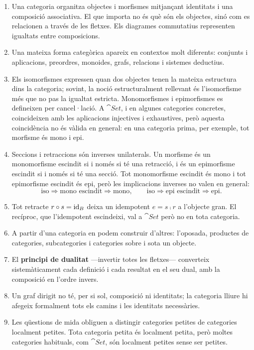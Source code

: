 \begin{resumcap}
\begin{enumerate}
  \item Una categoria organitza objectes i morfismes mitjançant identitats i una composició associativa. El que importa no és què són els objectes, sinó com es relacionen a través de les fletxes. Els diagrames commutatius representen igualtats entre composicions.
  \item Una mateixa forma categòrica apareix en contextos molt diferents: conjunts i aplicacions, preordres, monoides, grafs, relacions i sistemes deductius.
  \item Els isomorfismes expressen quan dos objectes tenen la mateixa estructura dins la categoria; sovint, la noció estructuralment rellevant és l'isomorfisme més que no pas la igualtat estricta. Monomorfismes i epimorfismes es defineixen per cancel·lació. A $\cat{Set}$, i en algunes categories concretes, coincideixen amb les aplicacions injectives i exhaustives, però aquesta coincidència no és vàlida en general: en una categoria prima, per exemple, tot morfisme és mono i epi.
  \item Seccions i retraccions són inverses unilaterals. Un morfisme és un monomorfisme escindit si i només si té una retracció, i és un epimorfisme escindit si i només si té una secció. Tot monomorfisme escindit és mono i tot epimorfisme escindit és epi, però les implicacions inverses no valen en general:
  \[
  \text{iso}\Longrightarrow\text{mono escindit}\Longrightarrow\text{mono},
  \qquad
  \text{iso}\Longrightarrow\text{epi escindit}\Longrightarrow\text{epi}.
  \]
  \item Tot retracte $r\circ s=\operatorname{id}_B$ deixa un idempotent $e=s\comp r$ a l'objecte gran. El recíproc, que l'idempotent escindeixi, val a $\cat{Set}$ però no en tota categoria.
  \item A partir d'una categoria en podem construir d'altres: l'oposada, productes de categories, subcategories i categories sobre i sota un objecte.
  \item El \textbf{principi de dualitat} ---invertir totes les fletxes--- converteix sistemàticament cada definició i cada resultat en el seu dual, amb la composició en l'ordre invers.
  \item Un graf dirigit no té, per si sol, composició ni identitats; la categoria lliure hi afegeix formalment tots els camins i les identitats necessàries.
  \item Les qüestions de mida obliguen a distingir categories petites de categories localment petites. Tota categoria petita és localment petita, però moltes categories habituals, com $\cat{Set}$, són localment petites sense ser petites.

\end{enumerate}
\end{resumcap}
